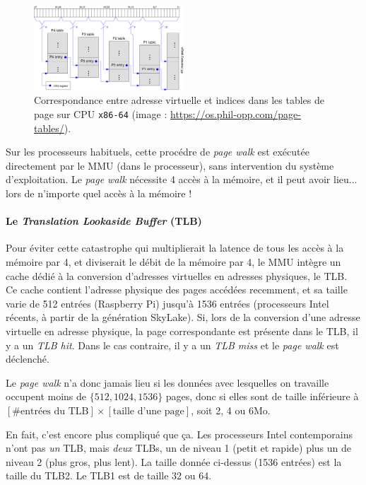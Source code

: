 \begin{figure}
  \centering
  \includegraphics[width=0.5\textwidth]{X86_Paging_64bit.pdf}
  \caption{Correspondance entre adresse virtuelle et indices dans les tables de
    page sur CPU \texttt{x86-64} (image :
    \url{https://os.phil-opp.com/page-tables/}). \label{fig:paging}}
\end{figure}

Sur les processeurs habituels, cette procédre de \emph{page walk} est exécutée
directement par le MMU (dans le processeur), sans intervention du système
d'exploitation. Le \emph{page walk} nécessite 4 accès à la mémoire, et il peut
avoir lieu... lors de n'importe quel accès à la mémoire !

\paragraph{Le \emph{Translation Lookaside Buffer} (TLB)} Pour éviter cette
catastrophe qui multiplierait la latence de tous les accès à la mémoire par 4,
et diviserait le débit de la mémoire par 4, le MMU intègre un cache dédié à la
conversion d'adresses virtuelles en adresses physiques, le TLB. Ce cache
contient l'adresse physique des pages accédées recemment, et sa taille varie de
512 entrées (Raspberry Pi) jusqu'à 1536 entrées (processeurs Intel récents, à
partir de la génération \og SkyLake\fg). Si, lors de la conversion d'une adresse
virtuelle en adresse physique, la page correspondante est présente dans le TLB,
il y a un \og \emph{TLB hit}. Dans le cas contraire, il y a un \emph{TLB miss}
et le \emph{page walk} est déclenché.

Le \emph{page walk} n'a donc jamais lieu si les données avec lesquelles on
travaille occupent moins de $\{512, 1024, 1536\}$ pages, donc si elles sont de
taille inférieure à
$[\# \text{entrées du TLB}] \times [\text{taille d'une page}]$, soit 2, 4 ou
6Mo.

\begin{danger}
  En fait, c'est encore plus compliqué que ça. Les processeurs Intel
  contemporains n'ont pas \emph{un} TLB, mais \emph{deux} TLBs, un de niveau 1
  (petit et rapide) plus un de niveau 2 (plus gros, plus lent). La taille donnée
  ci-dessus (1536 entrées) est la taille du TLB2. Le TLB1 est de taille 32 ou
  64.
\end{danger}

